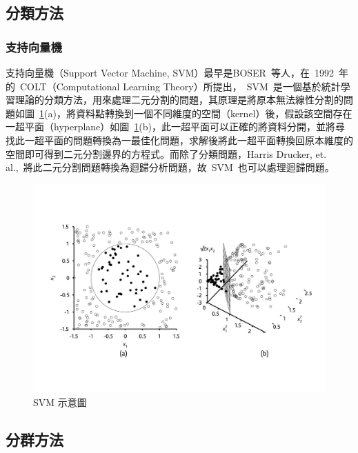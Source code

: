 \subsection{分類方法}

\subsubsection{支持向量機}

支持向量機（Support Vector Machine, SVM）最早是BOSER~\cite{boser1992}等人，在~1992~年的~COLT（Computational Learning Theory）所提出，~SVM~是一個基於統計學習理論的分類方法，用來處理二元分割的問題，其原理是將原本無法線性分割的問題如圖~\ref{fig:svm}(a)\cite{verplancke2008support}，將資料點轉換到一個不同維度的空間（kernel）後，假設該空間存在一超平面（hyperplane）如圖~\ref{fig:svm}(b)，此一超平面可以正確的將資料分開，並將尋找此一超平面的問題轉換為一最佳化問題，求解後將此一超平面轉換回原本維度的空間即可得到二元分割邊界的方程式。而除了分類問題，Harris Drucker, et. al.,\cite{drucker1997support}~將此二元分割問題轉換為迴歸分析問題，故~SVM~也可以處理迴歸問題。

\begin{figure}[hbtp]
  \begin{center}
    \includegraphics[width=1.0\textwidth]{figures/svm.jpg}
    \caption{SVM 示意圖}
    \label{fig:svm}
  \end{center}
\end{figure}

\subsection{分群方法}

